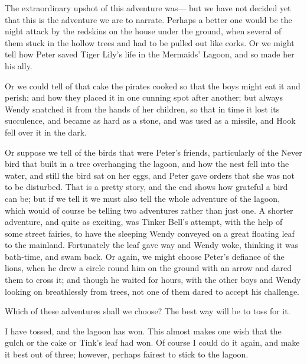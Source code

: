 The extraordinary upshot of this adventure was—%
but we have not decided yet that this is the adventure we are to narrate.
Perhaps a better one would be the night attack by the redskins on the house under the ground,
when several of them stuck in the hollow trees and had to be pulled out like corks.
Or we might tell how Peter saved Tiger Lily’s life in the Mermaids’ Lagoon, and so made her his ally.

Or we could tell of that cake the pirates cooked so that the boys might eat it and perish;
and how they placed it in one cunning spot after another;
but always Wendy snatched it from the hands of her children,
so that in time it lost its succulence, and became as hard as a stone, and was used as a missile,
and Hook fell over it in the dark.

Or suppose we tell of the birds that were Peter’s friends,
particularly of the Never bird that built in a tree overhanging the lagoon,
and how the nest fell into the water, and still the bird sat on her eggs,
and Peter gave orders that she was not to be disturbed.
That is a pretty story, and the end shows how grateful a bird can be;
but if we tell it we must also tell the whole adventure of the lagoon,
which would of course be telling two adventures rather than just one.
A shorter adventure, and quite as exciting, was Tinker Bell’s attempt, with the help of some street fairies,
to have the sleeping Wendy conveyed on a great floating leaf to the mainland.
Fortunately the leaf gave way and Wendy woke, thinking it was bath‐time, and swam back.
Or again, we might choose Peter’s defiance of the lions,
when he drew a circle round him on the ground with an arrow and dared them to cross it;
and though he waited for hours, with the other boys and Wendy looking on breathlessly from trees,
not one of them dared to accept his challenge.

Which of these adventures shall we choose?
The best way will be to toss for it.

I have tossed, and the lagoon has won.
This almost makes one wish that the gulch or the cake or Tink’s leaf had won.
Of course I could do it again, and make it best out of three;
however, perhaps fairest to stick to the lagoon.

\endinput
